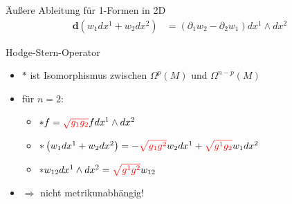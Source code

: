 \documentclass{beamer}
\newcommand{\exd}{\mathbf{d}}
\newcommand{\tred}[1]{\textcolor{red}{#1}}
\begin{document}
  \begin{frame}
    \begin{block}{Äußere Ableitung für 1-Formen in 2D}
      \begin{align*}
        \exd\left(w_{1}dx^{1} + w_{2}dx^{2}\right) &= \left( \partial_{1}w_{2} - \partial_{2}w_{1} \right) dx^{1}\wedge dx^{2}
      \end{align*}
    \end{block}
    \pause
    \begin{block}{Hodge-Stern-Operator}
      \begin{itemize}
        \item \( * \) ist Isomorphismus zwischen \( \Omega^{p}(M) \) und \( \Omega^{n-p}(M) \)
        \item<3-> für \( n = 2 \):
        {\begin{itemize}
          \item<7> \( *f = \tred{\sqrt{g_{1}g_{2}}}f dx^{1}\wedge dx^{2} \)
          \item<7> \( *\left(w_{1}dx^{1} + w_{2}dx^{2}\right) = -\tred{\sqrt{g_{1}g^{2}}}w_{2}dx^{1} + \tred{\sqrt{g^{1}g_{2}}}w_{1}dx^{2} \)
          \item<7> \( *w_{12} dx^{1}\wedge dx^{2} = \tred{\sqrt{g^{1}g^{2}}}w_{12} \)
        \end{itemize}}
        \item<7-> \( \Rightarrow \) nicht metrikunabhängig!
      \end{itemize}
    \end{block}
  \end{frame}
\end{document}
